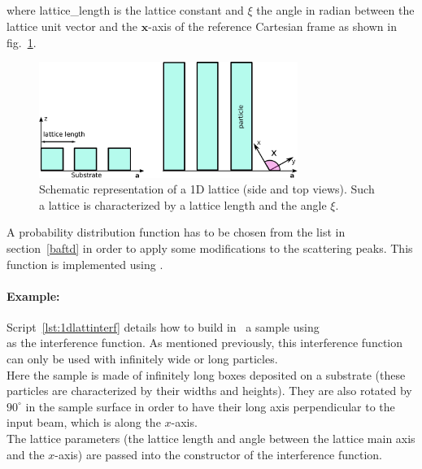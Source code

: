\newpage
\subsection{} 
where lattice\_length is the lattice constant and $\xi$ the angle in radian between the lattice unit vector and the $\mathbf{x}$-axis of the reference Cartesian frame as shown in fig.~\ref{fig:1dgrating}.

\begin{figure}[tb]
\begin{center}
\includegraphics[width=0.75\textwidth]{fig/drawing/1DGrating.pdf}
\end{center}
\caption{Schematic representation of a 1D lattice (side and top views). Such a lattice is characterized by a lattice length and the angle $\xi$.}
\label{fig:1dgrating}
\end{figure}


\vspace{12pt}
A probability distribution function  has to be chosen from the list in section~\ref{baftd} in order to apply some modifications to the scattering peaks. This function is implemented using . 

\paragraph{Example:} Script~\ref{lst:1dlattinterf} details how to build in  \BornAgain\ a sample using\\  as the interference function. As mentioned previously, this interference function can only be used with infinitely wide or long particles.\\ Here the sample is made of infinitely long boxes deposited on a substrate (these particles are characterized by their widths and heights). They are also rotated by $90^{\circ}$  in the sample surface in order to have their long axis perpendicular to the input beam, which is along the $x$-axis.\\
 The lattice parameters (the lattice length and angle between the lattice main axis and the $x$-axis) are passed into the constructor of the interference function.

